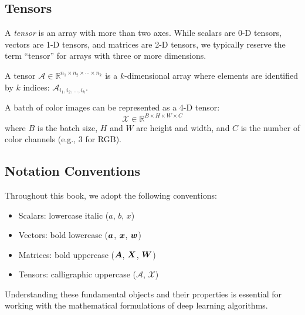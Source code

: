 \subsection{Tensors}

A \emph{tensor} is an array with more than two axes. While scalars are 0-D tensors, vectors are 1-D tensors, and matrices are 2-D tensors, we typically reserve the term ``tensor'' for arrays with three or more dimensions.

\begin{definition}[Tensor]
A tensor $\mathcal{A} \in \mathbb{R}^{n_1 \times n_2 \times \cdots \times n_k}$ is a $k$-dimensional array where elements are identified by $k$ indices: $\mathcal{A}_{i_1, i_2, \ldots, i_k}$.
\end{definition}

\begin{example}
A batch of color images can be represented as a 4-D tensor:
\begin{equation}
    \mathcal{X} \in \mathbb{R}^{B \times H \times W \times C}
\end{equation}
where $B$ is the batch size, $H$ and $W$ are height and width, and $C$ is the number of color channels (e.g., 3 for RGB).
\end{example}

\subsection{Notation Conventions}

Throughout this book, we adopt the following conventions:
\begin{itemize}
    \item Scalars: lowercase italic ($a$, $b$, $x$)
    \item Vectors: bold lowercase ($\boldsymbol{a}$, $\boldsymbol{x}$, $\boldsymbol{w}$)
    \item Matrices: bold uppercase ($\boldsymbol{A}$, $\boldsymbol{X}$, $\boldsymbol{W}$)
    \item Tensors: calligraphic uppercase ($\mathcal{A}$, $\mathcal{X}$)
\end{itemize}

Understanding these fundamental objects and their properties is essential for working with the mathematical formulations of deep learning algorithms.

